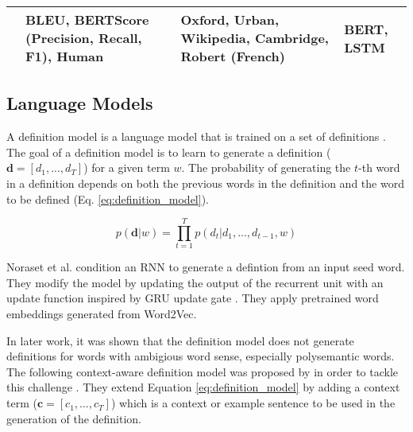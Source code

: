 \begin{longtable}{|p{3.5cm}|p{3.5cm}|p{3.5cm}|p{3.5cm}|}
    \hline
    \citeauthor*{reid_vcdm_2020} \citeyear{reid_vcdm_2020} \cite{reid_vcdm_2020}                                              & BLEU, BERTScore (Precision, Recall, F1), Human                   & Oxford, Urban, Wikipedia, Cambridge, Robert (French)                                                                                          & BERT, LSTM                               \\
    \hline
\end{longtable}

\subsection{Language Models}
A definition model is a language model that is trained on a set of definitions
\cite{noraset_definition_2016}. The goal of a definition model is to learn to
generate a definition ($\textbf{d} = [d_1, ..., d_T]$) for a given term $w$. The
probability of generating the $t$-th word in a definition depends on both the
previous words in the definition and the word to be defined (Eq.
\ref{eq:definition_model}).

\begin{equation}
    \label{eq:definition_model}
    p(\textbf{d} | w) = \prod_{t=1}^{T} p(d_t | d_1,...,d_{t-1}, w)
\end{equation}

Noraset et al. condition an RNN to generate a defintion from an input seed word.
They modify the model by updating the output of the recurrent unit with an
update function inspired by GRU update gate \cite{noraset_definition_2016}. They
apply pretrained word embeddings generated from Word2Vec.

In later work, it was shown that the definition model does not generate
definitions for words with ambigious word sense, especially polysemantic words.
The following context-aware definition model was proposed by
\citeauthor*{gadetsky_conditional_2018} in order to tackle this challenge
\cite{gadetsky_conditional_2018}. They extend Equation \ref{eq:definition_model}
by adding a context term ($\textbf{c} = [c_1, ..., c_T]$) which is a context or
example sentence to be used in the generation of the definition.


